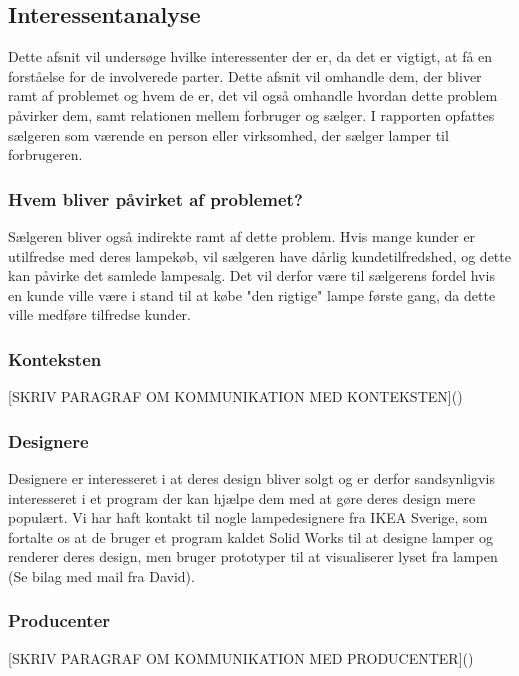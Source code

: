 \subsection{Interessentanalyse}
Dette afsnit vil undersøge hvilke interessenter der er, da det er vigtigt, at få en forståelse for de involverede parter. Dette afsnit vil omhandle dem, der bliver ramt af problemet og hvem de er, det vil også omhandle hvordan dette problem påvirker dem, samt relationen mellem forbruger og sælger. I rapporten opfattes sælgeren som værende en person eller virksomhed, der sælger lamper til forbrugeren. 

\subsubsection{Hvem bliver påvirket af problemet?}


Sælgeren bliver også indirekte ramt af dette problem. Hvis mange kunder er utilfredse med deres lampekøb, vil sælgeren have dårlig kundetilfredshed, og dette kan påvirke det samlede lampesalg. Det vil derfor være til sælgerens fordel hvis en kunde ville være i stand til at købe "den rigtige" lampe første gang, da dette ville medføre tilfredse kunder.


\subsubsection{Konteksten}
[SKRIV PARAGRAF OM KOMMUNIKATION MED KONTEKSTEN]()
\subsubsection{Designere}
Designere er interesseret i at deres design bliver solgt og er derfor sandsynligvis interesseret i et program der kan hjælpe dem med at gøre deres design mere populært.
Vi har haft kontakt til nogle lampedesignere fra IKEA Sverige, som fortalte os at de bruger et program kaldet Solid Works til at designe lamper og renderer deres design, men bruger prototyper til at visualiserer lyset fra lampen (Se bilag med mail fra David).

\subsubsection{Producenter}
[SKRIV PARAGRAF OM KOMMUNIKATION MED PRODUCENTER]()
